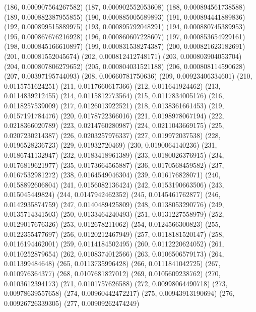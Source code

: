{					(186, 0.000907564267582)
					(187, 0.000902552053608)
					(188, 0.000894561738588)
					(189, 0.000882387955855)
					(190, 0.000885005689893)
					(191, 0.000894441889836)
					(192, 0.000899515889975)
					(193, 0.000895792048291)
					(194, 0.000880745389953)
					(195, 0.000867676216928)
					(196, 0.000860607228607)
					(197, 0.000853654929161)
					(198, 0.000845166610897)
					(199, 0.000831538274387)
					(200, 0.000821623182691)
					(201, 0.00081552045674)
					(202, 0.000812412748171)
					(203, 0.000803904053704)
					(204, 0.000807806279652)
					(205, 0.000804031521188)
					(206, 0.000808114590628)
					(207, 0.00397195744093)
					(208, 0.00660781750636)
					(209, 0.00923406334601)
					(210, 0.0115751624251)
					(211, 0.0117660617366)
					(212, 0.011641924462)
					(213, 0.0114839212455)
					(214, 0.0115812773564)
					(215, 0.0117834005176)
					(216, 0.0118257539009)
					(217, 0.0126013922521)
					(218, 0.0138361661453)
					(219, 0.0157191784476)
					(220, 0.0178722366016)
					(221, 0.0198978067194)
					(222, 0.0218366020789)
					(223, 0.0214760280987)
					(224, 0.0211043669175)
					(225, 0.0207230214387)
					(226, 0.0203257976337)
					(227, 0.019972037538)
					(228, 0.0196528236723)
					(229, 0.01932720469)
					(230, 0.0190064140236)
					(231, 0.0186741132947)
					(232, 0.0183418961389)
					(233, 0.0180026376915)
					(234, 0.0176819621977)
					(235, 0.0173664565887)
					(236, 0.0170568459582)
					(237, 0.0167532981272)
					(238, 0.0164549046304)
					(239, 0.016176828071)
					(240, 0.0158892606804)
					(241, 0.0156082136424)
					(242, 0.0153190663506)
					(243, 0.015045449824)
					(244, 0.0147942462352)
					(245, 0.0145461762877)
					(246, 0.0142935874759)
					(247, 0.0140489425809)
					(248, 0.0138053290776)
					(249, 0.0135714341503)
					(250, 0.0133464240493)
					(251, 0.0131227558979)
					(252, 0.0129017676326)
					(253, 0.012678211062)
					(254, 0.0124566300823)
					(255, 0.0122355477697)
					(256, 0.0120212467949)
					(257, 0.0118181520147)
					(258, 0.0116194462001)
					(259, 0.0114184502495)
					(260, 0.0112220624052)
					(261, 0.0110252879654)
					(262, 0.0108374012566)
					(263, 0.0106506579173)
					(264, 0.011399484648)
					(265, 0.0113735996428)
					(266, 0.0111841042725)
					(267, 0.010976364377)
					(268, 0.0107681827012)
					(269, 0.0105609238762)
					(270, 0.0103612394173)
					(271, 0.0101757626588)
					(272, 0.00998064490718)
					(273, 0.00978639557658)
					(274, 0.00960442472217)
					(275, 0.00943913190694)
					(276, 0.00926726339305)
					(277, 0.00909262474249)
}
